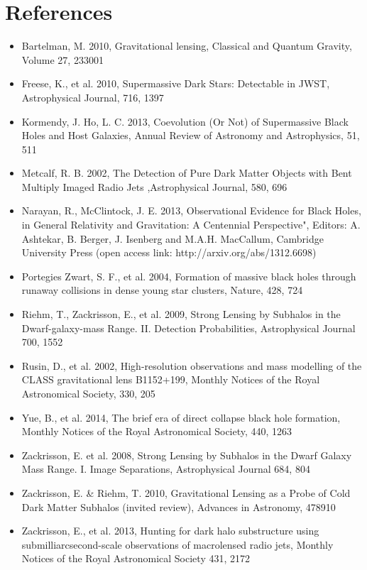 \documentclass[a4paper, 11pt]{article}
\begin{document}
\section*{References}
\begin{itemize}
\item Bartelman, M. 2010, Gravitational lensing, Classical and Quantum Gravity, Volume 27, 233001
\item Freese, K., et al. 2010, Supermassive Dark Stars: Detectable in JWST, Astrophysical Journal, 716, 1397
\item Kormendy, J. Ho, L. C. 2013, Coevolution (Or Not) of Supermassive Black Holes and Host Galaxies, Annual Review of Astronomy and Astrophysics, 51, 511
\item Metcalf, R. B. 2002, The Detection of Pure Dark Matter Objects with Bent Multiply Imaged Radio Jets ,Astrophysical Journal, 580, 696
\item Narayan, R., McClintock, J. E. 2013, Observational Evidence for Black Holes, in General Relativity and Gravitation: A Centennial Perspective", Editors: A. Ashtekar, B. Berger, J. Isenberg and M.A.H. MacCallum, Cambridge University Press (open access link: http://arxiv.org/abs/1312.6698)
\item Portegies Zwart, S. F., et al. 2004, Formation of massive black holes through runaway collisions in dense young star clusters, Nature, 428, 724
\item  Riehm, T., Zackrisson, E., et al. 2009, Strong Lensing by Subhalos in the Dwarf-galaxy-mass Range. II. Detection Probabilities, Astrophysical Journal 700, 1552
\item  Rusin, D., et al. 2002, High-resolution observations and mass modelling of the CLASS gravitational lens B1152+199, Monthly Notices of the Royal Astronomical Society, 330, 205
\item  Yue, B., et al. 2014, The brief era of direct collapse black hole formation, Monthly Notices of the Royal Astronomical Society, 440, 1263
\item  Zackrisson, E. et al. 2008, Strong Lensing by Subhalos in the Dwarf Galaxy Mass Range. I. Image Separations, Astrophysical Journal 684, 804
\item  Zackrisson, E. \& Riehm, T. 2010, Gravitational Lensing as a Probe of Cold Dark Matter Subhalos (invited review), Advances in Astronomy, 478910
\item  Zackrisson, E., et al. 2013, Hunting for dark halo substructure using submilliarcsecond-scale observations of macrolensed radio jets, Monthly Notices of the Royal Astronomical Society 431, 2172
\end{itemize}
\end{document}
